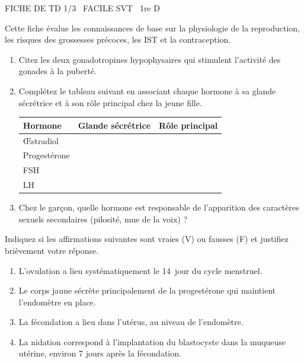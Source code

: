 \documentclass[11pt]{article}
\begin{document}
\begin{tcolorbox}[enhanced,colback=popink,colframe=popink,arc=10pt,boxrule=0pt,left=12pt,right=12pt,top=9pt,bottom=9pt]
{\color{white}\popxbold\small FICHE DE TD 1/3 \textbullet\ FACILE \hfill SVT \textbullet\ 1re D\par}
\end{tcolorbox}
\vspace{4pt}
Cette fiche évalue les connaissances de base sur la physiologie de la reproduction, les risques des grossesses précoces, les IST et la contraception.

\begin{exercice}
\begin{enumerate}
    \item Citez les deux gonadotropines hypophysaires qui stimulent l'activité des gonades à la puberté.
    \item Complétez le tableau suivant en associant chaque hormone à sa glande sécrétrice et à son rôle principal chez la jeune fille.
    \begin{tabular}{|p{3cm}|p{4cm}|p{5cm}|}
        \hline
        \textbf{Hormone} & \textbf{Glande sécrétrice} & \textbf{Rôle principal} \\
        \hline
        Œstradiol &  &  \\
        \hline
        Progestérone &  &  \\
        \hline
        FSH &  &  \\
        \hline
        LH &  &  \\
        \hline
    \end{tabular}
    \item Chez le garçon, quelle hormone est responsable de l'apparition des caractères sexuels secondaires (pilosité, mue de la voix) ?
\end{enumerate}
\end{exercice}

\begin{exercice}
Indiquez si les affirmations suivantes sont vraies (V) ou fausses (F) et justifiez brièvement votre réponse.
\begin{enumerate}
    \item L'ovulation a lieu systématiquement le 14\ieme\ jour du cycle menstruel.
    \item Le corps jaune sécrète principalement de la progestérone qui maintient l'endomètre en place.
    \item La fécondation a lieu dans l'utérus, au niveau de l'endomètre.
    \item La nidation correspond à l'implantation du blastocyste dans la muqueuse utérine, environ 7 jours après la fécondation.
\end{enumerate}
\end{exercice}
\end{document}
